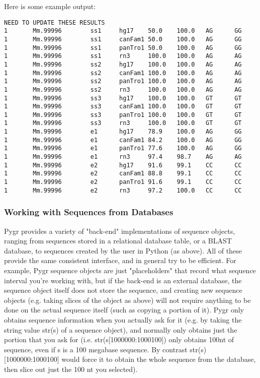 \documentclass{howto}
\begin{document}
Here is some example output:
\begin{verbatim}
NEED TO UPDATE THESE RESULTS
1       Mm.99996        ss1     hg17    50.0    100.0   AG      GG
1       Mm.99996        ss1     canFam1 50.0    100.0   AG      GG
1       Mm.99996        ss1     panTro1 50.0    100.0   AG      GG
1       Mm.99996        ss1     rn3     100.0   100.0   AG      AG
1       Mm.99996        ss2     hg17    100.0   100.0   AG      AG
1       Mm.99996        ss2     canFam1 100.0   100.0   AG      AG
1       Mm.99996        ss2     panTro1 100.0   100.0   AG      AG
1       Mm.99996        ss2     rn3     100.0   100.0   AG      AG
1       Mm.99996        ss3     hg17    100.0   100.0   GT      GT
1       Mm.99996        ss3     canFam1 100.0   100.0   GT      GT
1       Mm.99996        ss3     panTro1 100.0   100.0   GT      GT
1       Mm.99996        ss3     rn3     100.0   100.0   GT      GT
1       Mm.99996        e1      hg17    78.9    100.0   AG      GG
1       Mm.99996        e1      canFam1 84.2    100.0   AG      GG
1       Mm.99996        e1      panTro1 77.6    100.0   AG      GG
1       Mm.99996        e1      rn3     97.4    98.7    AG      AG
1       Mm.99996        e2      hg17    91.6    99.1    CC      CC
1       Mm.99996        e2      canFam1 88.8    99.1    CC      CC
1       Mm.99996        e2      panTro1 91.6    99.1    CC      CC
1       Mm.99996        e2      rn3     97.2    100.0   CC      CC
\end{verbatim}

\subsubsection{Working with Sequences from Databases}

Pygr provides a variety of "back-end" implementations of sequence objects, ranging from sequences stored in a relational database table, or a BLAST database, to sequences created by the user in Python (as above).  All of these provide the same consistent interface, and in general try to be efficient.  For example, Pygr sequence objects are just "placeholders" that record what sequence interval you're working with, but if the back-end is an external database, the sequence object itself does not store the sequence, and creating new sequence objects (e.g. taking slices of the object as above) will not require anything to be done on the actual sequence itself (such as copying a portion of it).  Pygr only obtains sequence information when you actually ask for it (e.g. by taking the string value str(s) of a sequence object), and normally only obtains just the portion that you ask for (i.e. str(s[1000000:1000100]) only obtains 100nt of sequence, even if s is a 100 megabase sequence.  By contrast str(s)[1000000:1000100] would force it to obtain the whole sequence from the database, then slice out just the 100 nt you selected). 
\end{document}
